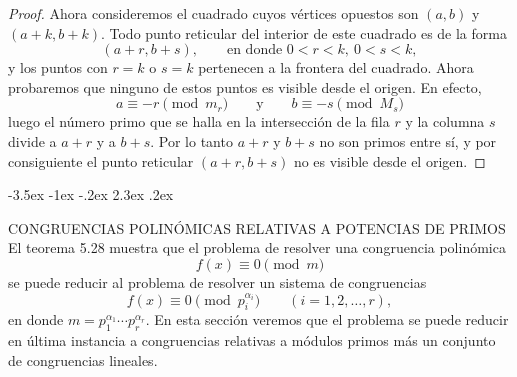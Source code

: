 \documentclass[12pt,a4paper]{book}
\makeatletter
\renewcommand\section{\@startsection{section}{1}{\z@}%
  {-3.5ex \@plus -1ex \@minus -.2ex}%
  {2.3ex \@plus .2ex}%
  {\normalfont\Large\bfseries\raggedright}}
\makeatother
\begin{document}
\begin{proof}
        Ahora consideremos el cuadrado cuyos vértices opuestos son $(a,b)$ y
        $(a+k,b+k)$. Todo punto reticular del interior de este cuadrado es de la forma
        \begin{equation*}
            (a+r,b+s),\qquad\text{en donde }0<r<k,\ 0<s<k,
        \end{equation*}
        y los puntos con $r=k$ o $s=k$ pertenecen a la frontera del cuadrado. Ahora
        probaremos que ninguno de estos puntos es visible desde el origen. En efecto,
        \begin{equation*}
            a\equiv-r\pmod{m_{r}}\qquad\text{y}\qquad b\equiv-s\pmod{M_{s}}
        \end{equation*}
        luego el número primo que se halla en la intersección de la fila $r$ y la
        columna $s$ divide a $a+r$ y a $b+s$. Por lo tanto $a+r$ y $b+s$ no son primos
        entre sí, y por consiguiente el punto reticular $(a+r,b+s)$ no es visible desde el
        origen.
    \end{proof}

    \section{CONGRUENCIAS POLINÓMICAS RELATIVAS A POTENCIAS DE PRIMOS}
    El teorema 5.28 muestra que el problema de resolver una congruencia polinómica
    \begin{equation*}
        f(x)\equiv0\pmod{m}
    \end{equation*}
    se puede reducir al problema de resolver un sistema de congruencias
    \begin{equation*}
        f(x)\equiv0\pmod{p_{i}^{\alpha_{i}}}\qquad(i=1,2,\dots,r),
    \end{equation*}
    en donde $m=p_{1}^{\alpha_{1}}\cdots p_{r}^{\alpha_{r}}$. En esta sección veremos que el
    problema se puede reducir en última instancia a congruencias relativas a módulos
    primos más un conjunto de congruencias lineales.
\end{document}
